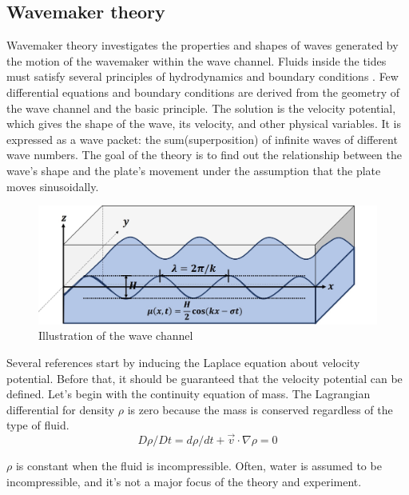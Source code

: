 \subsection{Wavemaker theory}

Wavemaker theory investigates the properties and shapes of waves generated by the motion of the wavemaker within the wave channel. Fluids inside the tides must satisfy several principles of hydrodynamics and boundary conditions \cite{dean1991water, zhang2007deterministic}. Few differential equations and boundary conditions are derived from the geometry of the wave channel and the basic principle. The solution is the velocity potential, which gives the shape of the wave, its velocity, and other physical variables. It is expressed as a wave packet: the sum(superposition) of infinite waves of different wave numbers. The goal of the theory is to find out the relationship between the wave's shape and the plate's movement under the assumption that the plate moves sinusoidally.

\begin{figure}[h]
    \centering
    \captionsetup{}
    \includegraphics[width=13cm]{images/Water_Channel(Illustrated).jpg}
    \caption{Illustration of the wave channel}
    \label{Water_tank(Illustrated)}
\end{figure}

Several references start by inducing the Laplace equation about velocity potential. Before that, it should be guaranteed that the velocity potential can be defined. Let's begin with the continuity equation of mass. The Lagrangian differential for density $\rho$ is zero because the mass is conserved regardless of the type of fluid.
%
\begin{equation}
    {D\rho/Dt = d\rho/dt + \Vec{v} \cdot \nabla\rho = 0}\label{eq_001}
\end{equation}

$\rho$ is constant when the fluid is incompressible. Often, water is assumed to be incompressible, and it's not a major focus of the theory and experiment.

